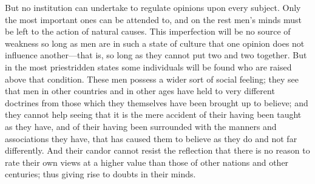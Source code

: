 But no institution can undertake to regulate opinions upon every
subject. Only the most important ones can be attended to, and on the
rest men's minds must be left to the action of natural causes. This
imperfection will be no source of weakness so long as men are in such
a state of culture that one opinion does not influence
an\-oth\-er---that is, so long as they cannot put two and two
together. But in the most priestridden states some individuals will be
found who are raised above that condition. These men possess a wider
sort of social  feeling; they see that men in other countries
and in other ages have held to very different doctrines from those
which they themselves have been brought up to believe; and they cannot
help seeing that it is the mere accident of their having been taught
as they have, and of their having been surrounded with the manners and
associations they have, that has caused them to believe as they do and
not far differently. And their candor cannot resist the reflection
that there is no reason to rate their own views at a higher value than
those of other nations and other centuries; thus giving rise to doubts
in their minds.

